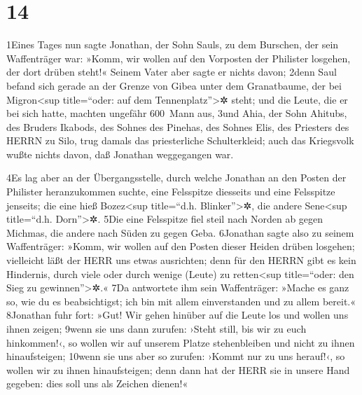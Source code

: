 \hypertarget{section-13}{%
\section{14}\label{section-13}}

1Eines Tages nun sagte Jonathan, der Sohn Sauls, zu dem Burschen, der
sein Waffenträger war: »Komm, wir wollen auf den Vorposten der Philister
losgehen, der dort drüben steht!« Seinem Vater aber sagte er nichts
davon; 2denn Saul befand sich gerade an der Grenze von Gibea unter dem
Granatbaume, der bei Migron\textless sup title=``oder: auf dem
Tennenplatz''\textgreater✲ steht; und die Leute, die er bei sich hatte,
machten ungefähr 600~Mann aus, 3und Ahia, der Sohn Ahitubs, des Bruders
Ikabods, des Sohnes des Pinehas, des Sohnes Elis, des Priesters des
HERRN zu Silo, trug damals das priesterliche Schulterkleid; auch das
Kriegsvolk wußte nichts davon, daß Jonathan weggegangen war.

4Es lag aber an der Übergangsstelle, durch welche Jonathan an den Posten
der Philister heranzukommen suchte, eine Felsspitze diesseits und eine
Felsspitze jenseits; die eine hieß Bozez\textless sup title=``d.h.
Blinker''\textgreater✲, die andere Sene\textless sup title=``d.h.
Dorn''\textgreater✲. 5Die eine Felsspitze fiel steil nach Norden ab
gegen Michmas, die andere nach Süden zu gegen Geba. 6Jonathan sagte also
zu seinem Waffenträger: »Komm, wir wollen auf den Posten dieser Heiden
drüben losgehen; vielleicht läßt der HERR uns etwas ausrichten; denn für
den HERRN gibt es kein Hindernis, durch viele oder durch wenige (Leute)
zu retten\textless sup title=``oder: den Sieg zu
gewinnen''\textgreater✲.« 7Da antwortete ihm sein Waffenträger: »Mache
es ganz so, wie du es beabsichtigst; ich bin mit allem einverstanden und
zu allem bereit.« 8Jonathan fuhr fort: »Gut! Wir gehen hinüber auf die
Leute los und wollen uns ihnen zeigen; 9wenn sie uns dann zurufen:
›Steht still, bis wir zu euch hinkommen!‹, so wollen wir auf unserem
Platze stehenbleiben und nicht zu ihnen hinaufsteigen; 10wenn sie uns
aber so zurufen: ›Kommt nur zu uns herauf!‹, so wollen wir zu ihnen
hinaufsteigen; denn dann hat der HERR sie in unsere Hand gegeben: dies
soll uns als Zeichen dienen!«

